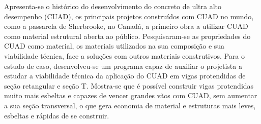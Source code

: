 \documentclass[
	12pt,				%
	openright,			%
	oneside,			%
	a4paper,			%
	chapter=TITLE,		%
	english,			%
	french,				%
	spanish,			%
	brazil				%
	]{abntex2}
\begin{document}

\setlength{\absparsep}{18pt} %
\begin{resumo}
 


Apresenta-se o histórico do desenvolvimento do concreto de ultra alto desempenho (CUAD), os principais projetos construídos com CUAD no mundo, como a passarela de Sherbrooke, no Canadá, a primeiro obra a utilizar CUAD como material estrutural  aberta ao público. Pesquisaram-se as propriedades do CUAD como material, os materiais utilizados na sua composição e sua viabilidade técnica, face a soluções com outros materiais construtivos. Para o estudo de caso, desenvolveu-se um programa capaz de auxiliar o projetista a estudar a viabilidade técnica da aplicação do CUAD em vigas protendidas de seção retangular e seção T. Mostra-se que é possível construir vigas protendidas muito mais esbeltas e capazes de vencer grandes vãos com CUAD, sem aumentar a sua seção transversal, o que gera economia de material e estruturas mais leves, esbeltas e rápidas de se construir.
 

\end{resumo}
\end{document}
